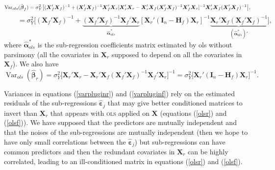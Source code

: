 \documentclass[12pt,a4paper]{report}
\begin{document}
\begin{displaymath}\fontsize{10}{10}\selectfont{
	\operatorname{Var}_{ols}(\hat{\boldsymbol{\beta}}_{f})=\sigma_Y^2\big[ 
(\boldsymbol{X}_f'\boldsymbol{X}_f)^{-1}+(\boldsymbol{X}_f'\boldsymbol{X}_f)^{-1}\boldsymbol{X}_f'\boldsymbol{X}_r
[\boldsymbol{X}_r'\boldsymbol{X}_r-\boldsymbol{X}_r'\boldsymbol{X}_f(\boldsymbol{X}_f'\boldsymbol{X}_f)^{-1}\boldsymbol{X}_f'\boldsymbol{X}_r]^{-1}
\boldsymbol{X}_r'\boldsymbol{X}_f(\boldsymbol{X}_f'\boldsymbol{X}_f)^{-1}\big] }, 
\end{displaymath}
\begin{equation}
\qquad = \sigma_Y^2\big[ 
(\boldsymbol{X}_f'\boldsymbol{X}_f)^{-1}+\underbrace{(\boldsymbol{X}_f'\boldsymbol{X}_f)^{-1}\boldsymbol{X}_f'\boldsymbol{X}_r}_{\hat{\boldsymbol{\alpha}}^*_{ols}}
[ \boldsymbol{X}_r'(\boldsymbol{I}_n-\boldsymbol{H}_f)\boldsymbol{X}_r]^{-1}
\underbrace{\boldsymbol{X}_r'\boldsymbol{X}_f(\boldsymbol{X}_f'\boldsymbol{X}_f)^{-1}}_{(\hat{\boldsymbol{\alpha}}^*_{ols})'}\big] ,\label{olsf}
\end{equation}
where $\hat{\boldsymbol{\alpha}}^*_{ols}$ is the sub-regression coefficients matrix estimated by {\sc ols} without parsimony (all the covariates in $\boldsymbol{X}_r$ supposed to depend on all the covariates in $\boldsymbol{X}_f$).
We also have
\begin{equation}
	\operatorname{Var}_{ols}(\hat{\boldsymbol{\beta}}_{r})=
	\sigma_Y^2\big[ \boldsymbol{X}_r'\boldsymbol{X}_r-\boldsymbol{X}_r'\boldsymbol{X}_f(\boldsymbol{X}_f'\boldsymbol{X}_f)^{-1}\boldsymbol{X}_f'\boldsymbol{X}_r\big]^{-1}
	=\sigma_Y^2\big[ \boldsymbol{X}_r'(\boldsymbol{I}_n-\boldsymbol{H}_f)\boldsymbol{X}_r\big]^{-1}. \label{olsr}
\end{equation}

Variances in equations (\ref{varpluginr}) and (\ref{varpluginf}) rely on the estimated residuals of the sub-regressions $\hat{\boldsymbol{\varepsilon}}_j$ that may give better conditioned matrices to invert than $\boldsymbol{X}_r$ that appears with \textsc{ols} applied on $\boldsymbol{X}$ (equations (\ref{olsr}) and (\ref{olsf})). We have supposed that the predictors are mutually independent and that the noises of the sub-regressions are mutually independent (then we hope to have only small correlations between the $\hat{\boldsymbol{\varepsilon}}_j$) but sub-regressions can have common predictors and then the redundant covariates in $\boldsymbol{X}_r$ can be highly correlated, leading to an ill-conditioned matrix in equations (\ref{olsr}) and (\ref{olsf}). 
\end{document}
